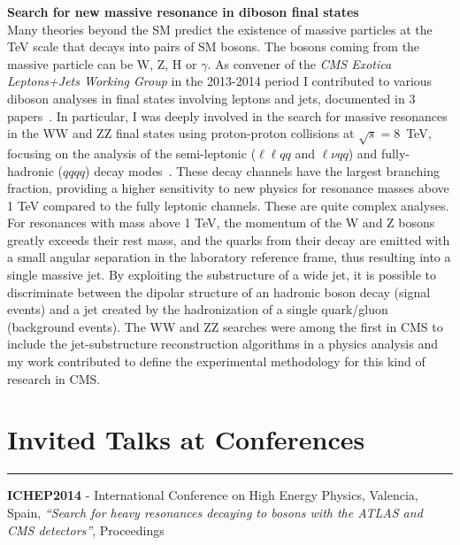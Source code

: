\documentclass[10pt, a4paper]{article}
\newcommand{\years}[1]{\marginnote{\hskip-0.2in{\small #1}}}
\begin{document}
{\bf Search for new massive resonance in diboson final states} \\[0.5em]
Many theories beyond the SM predict the existence of massive particles
at the TeV scale that decays into pairs of SM bosons. The bosons
coming from the massive particle can be W, Z, H or $\gamma$. 
As convener of the {\it CMS Exotica Leptons+Jets Working
Group} in the 2013-2014 period I contributed to various diboson
analyses in final states involving leptons and jets, documented in 
3 papers~\cite{Khachatryan:2015ywa,Khachatryan:2014gha,CMS:2015neg}.
In particular, I was deeply involved in the search for massive resonances in the WW and ZZ 
final states using proton-proton collisions at $\sqrt{s}=8$~TeV, focusing
on the analysis of the semi-leptonic ($\ell\ell qq$ and $\ell\nu qq$) 
and fully-hadronic ($qqqq$) decay modes~\cite{Khachatryan:2014gha}.
These decay channels have the largest branching fraction, providing
a higher sensitivity to new physics for resonance masses above 1 TeV
compared to the fully leptonic channels.
These are quite complex analyses. For resonances with mass above 1 TeV, the momentum of the W and Z
bosons greatly exceeds their rest mass, and the quarks from their decay
are emitted with a small angular separation in the laboratory
reference frame, thus resulting into a single massive jet.  
By exploiting the substructure of a wide jet, it is possible to
discriminate between the dipolar structure of an hadronic boson decay (signal events)
and a jet created by the hadronization of a single quark/gluon (background events).
The WW and ZZ searches were among the first in CMS to include the
jet-substructure reconstruction algorithms in a physics analysis and
my work contributed to define the experimental
methodology for this kind of research in CMS.

\section*{Invited Talks at Conferences}
\vspace{-5pt}
\hrule
\vspace{10pt}
\years{07/2014}\textbf{ICHEP2014} - International Conference on High Energy Physics, Valencia, Spain, \textit{``Search for heavy resonances decaying to bosons with the ATLAS and CMS detectors''}, Proceedings~\cite{Santanastasio:ICHEP2014}
\end{document}
